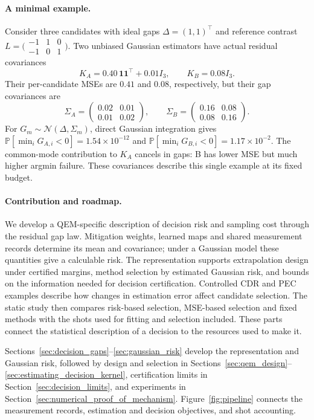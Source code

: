 \documentclass[a4paper,onecolumn,unpublished,nopdfoutputerror]{quantumarticle}
\theoremstyle{plain}
\theoremstyle{definition}
\newcommand{\Prob}{\mathbb{P}}
\newcommand{\calN}{\mathcal{N}}
\newcommand{\1}{\mathbf{1}}
\begin{document}
\paragraph{A minimal example.}
Consider three candidates with ideal gaps $\Delta=(1,1)^\top$ and reference contrast $L=\bigl(\begin{smallmatrix}-1&1&0\\-1&0&1\end{smallmatrix}\bigr)$. Two unbiased Gaussian estimators have actual residual covariances
\[
K_A=0.40\,\1\1^\top+0.01I_3,\qquad K_B=0.08I_3.
\]
Their per-candidate MSEs are $0.41$ and $0.08$, respectively, but their gap covariances are
\[
\Sigma_A=\begin{pmatrix}0.02&0.01\\0.01&0.02\end{pmatrix},
\qquad
\Sigma_B=\begin{pmatrix}0.16&0.08\\0.08&0.16\end{pmatrix}.
\]
For $G_m\sim\calN(\Delta,\Sigma_m)$, direct Gaussian integration gives $\Prob[\min_iG_{A,i}<0]=1.54\times10^{-12}$ and $\Prob[\min_iG_{B,i}<0]=1.17\times10^{-2}$. The common-mode contribution to $K_A$ cancels in gaps: B has lower MSE but much higher argmin failure. These covariances describe this single example at its fixed budget.

\paragraph{Contribution and roadmap.}
We develop a QEM-specific description of decision risk and sampling cost through the residual gap law. Mitigation weights, learned maps and shared measurement records determine its mean and covariance; under a Gaussian model these quantities give a calculable risk. The representation supports extrapolation design under certified margins, method selection by estimated Gaussian risk, and bounds on the information needed for decision certification. Controlled CDR and PEC examples describe how changes in estimation error affect candidate selection. The static study then compares risk-based selection, MSE-based selection and fixed methods with the shots used for fitting and selection included. These parts connect the statistical description of a decision to the resources used to make it.

Sections~\ref{sec:decision_gaps}--\ref{sec:gaussian_risk} develop the representation and Gaussian risk, followed by design and selection in Sections~\ref{sec:qem_design}--\ref{sec:estimating_decision_kernel}, certification limits in Section~\ref{sec:decision_limits}, and experiments in Section~\ref{sec:numerical_proof_of_mechanism}. Figure~\ref{fig:pipeline} connects the measurement records, estimation and decision objectives, and shot accounting.
\end{document}
